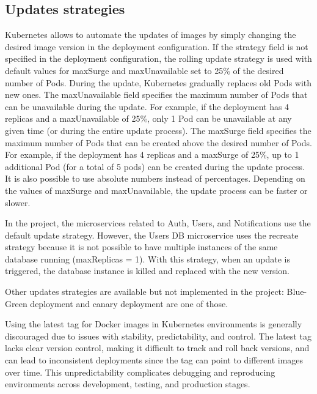 \documentclass[manuscript,screen,review]{acmart}
\begin{document}
\subsection{Updates strategies}
Kubernetes allows to automate the updates of images by simply changing the desired image version in the deployment configuration. If the strategy field is not specified in the deployment configuration, the rolling update strategy is used with default values for maxSurge and maxUnavailable set to 25\% of the desired number of Pods. During the update, Kubernetes gradually replaces old Pods with new ones. The maxUnavailable field specifies the maximum number of Pods that can be unavailable during the update. For example, if the deployment has 4 replicas and a maxUnavailable of 25\%, only 1 Pod can be unavailable at any given time (or during the entire update process). The maxSurge field specifies the maximum number of Pods that can be created above the desired number of Pods. For example, if the deployment has 4 replicas and a maxSurge of 25\%, up to 1 additional Pod (for a total of 5 pods) can be created during the update process. It is also possible to use absolute numbers instead of percentages. Depending on the values of maxSurge and maxUnavailable, the update process can be faster or slower. 

In the project, the microservices related to Auth, Users, and Notifications use the default update strategy. However, the Users DB microservice uses the recreate strategy because it is not possible to have multiple instances of the same database running (maxReplicas = 1). With this strategy, when an update is triggered, the database instance is killed and replaced with the new version.

Other updates strategies are available but not implemented in the project: Blue-Green deployment and canary deployment are one of those. 

Using the latest tag for Docker images in Kubernetes environments is generally discouraged due to issues with stability, predictability, and control. The latest tag lacks clear version control, making it difficult to track and roll back versions, and can lead to inconsistent deployments since the tag can point to different images over time. This unpredictability complicates debugging and reproducing environments across development, testing, and production stages.
\end{document}
